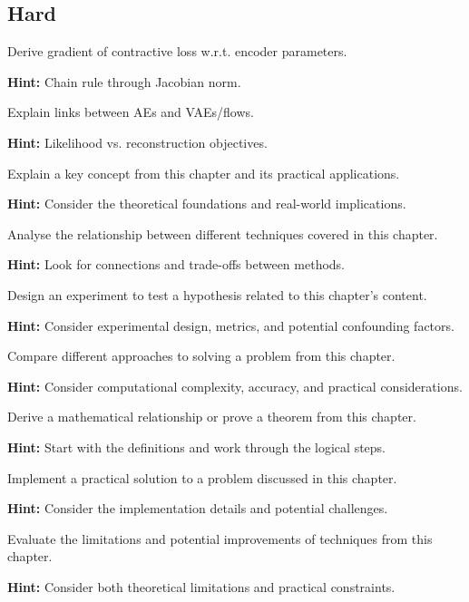 \subsection*{Hard}

\begin{problem}
Derive gradient of contractive loss w.r.t. encoder parameters.

\textbf{Hint:} Chain rule through Jacobian norm.
\end{problem}

\begin{problem}
Explain links between AEs and VAEs/flows.

\textbf{Hint:} Likelihood vs. reconstruction objectives.
\end{problem}


\begin{problem}
Explain a key concept from this chapter and its practical applications.

\textbf{Hint:} Consider the theoretical foundations and real-world implications.
\end{problem}

\begin{problem}
Analyse the relationship between different techniques covered in this chapter.

\textbf{Hint:} Look for connections and trade-offs between methods.
\end{problem}

\begin{problem}
Design an experiment to test a hypothesis related to this chapter's content.

\textbf{Hint:} Consider experimental design, metrics, and potential confounding factors.
\end{problem}

\begin{problem}
Compare different approaches to solving a problem from this chapter.

\textbf{Hint:} Consider computational complexity, accuracy, and practical considerations.
\end{problem}

\begin{problem}
Derive a mathematical relationship or prove a theorem from this chapter.

\textbf{Hint:} Start with the definitions and work through the logical steps.
\end{problem}

\begin{problem}
Implement a practical solution to a problem discussed in this chapter.

\textbf{Hint:} Consider the implementation details and potential challenges.
\end{problem}

\begin{problem}
Evaluate the limitations and potential improvements of techniques from this chapter.

\textbf{Hint:} Consider both theoretical limitations and practical constraints.
\end{problem}
